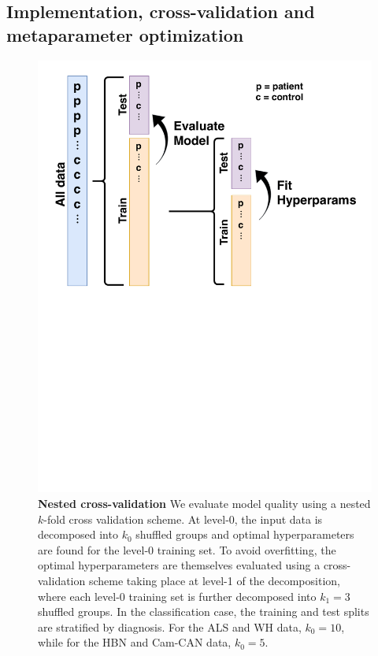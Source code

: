 \documentclass[10pt,%
               aps,%
               prl,%
               preprint,%
               superscriptaddress,%
               preprintnumbers,%
               amsmath,%
               floatfix,%
               endfloats*]{revtex4-2}
\begin{document}
\subsection{Implementation, cross-validation and metaparameter optimization}

\begin{figure}[!h]
    \includegraphics[width=\columnwidth]{nested-cross-validation.pdf}
    \caption{{\bf Nested cross-validation}
        \label{fig:nested-cross-val}
        We evaluate model quality using a nested $k$-fold cross validation
        scheme. At level-0, the input data is decomposed into $k_0$ shuffled
        groups and optimal hyperparameters are found for the level-0 training
        set. To avoid overfitting, the optimal hyperparameters are themselves
        evaluated using a cross-validation scheme taking place at level-1 of
        the decomposition, where each level-0 training set is further
        decomposed into $k_1 = 3$ shuffled groups. In the classification
        case, the training and test splits are stratified by diagnosis. For
        the ALS and WH data, $k_0 = 10$, while for the HBN and Cam-CAN data,
        $k_0 = 5$.
    }
\end{figure}
\end{document}
